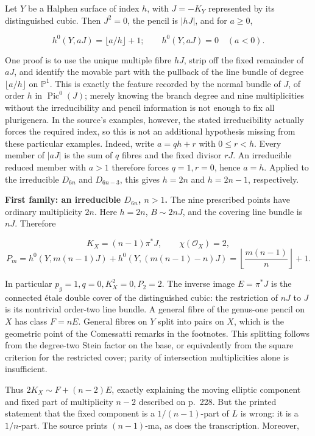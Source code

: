 Let \(Y\) be a Halphen surface of index \(h\), with \(J=-K_Y\) represented by its distinguished cubic. Then \(J^2=0\), the pencil is \(|hJ|\), and for \(a\geq0\),

\[
h^0(Y,aJ)=\lfloor a/h\rfloor+1;
\qquad h^0(Y,aJ)=0\quad(a<0).
\tag{VI-H}
\]

One proof is to use the unique multiple fibre \(hJ\), strip off the fixed remainder of \(aJ\), and identify the movable part with the pullback of the line bundle of degree \(\lfloor a/h\rfloor\) on \(\mathbb P^1\). This is exactly the feature recorded by the normal bundle of \(J\), of order \(h\) in \(\operatorname{Pic}^0(J)\); merely knowing the branch degree and nine multiplicities without the irreducibility and pencil information is not enough to fix all plurigenera. In the source's examples, however, the stated irreducibility actually forces the required index, so this is not an additional hypothesis missing from these particular examples. Indeed, write \(a=qh+r\) with \(0\leq r<h\). Every member of \(|aJ|\) is the sum of \(q\) fibres and the fixed divisor \(rJ\). An irreducible reduced member with \(a>1\) therefore forces \(q=1,r=0\), hence \(a=h\). Applied to the irreducible \(D_{6n}\) and \(D_{6n-3}\), this gives \(h=2n\) and \(h=2n-1\), respectively.

\textbf{First family: an irreducible \(D_{6n}\), \(n>1\).} The nine prescribed points have ordinary multiplicity \(2n\). Here \(h=2n\), \(B\sim2nJ\), and the covering line bundle is \(nJ\). Therefore

\[
K_X=(n-1)\pi^*J,\qquad \chi(\mathcal O_X)=2,
\] \[
P_m=h^0(Y,m(n-1)J)+h^0(Y,(m(n-1)-n)J)
=\left\lfloor\frac{m(n-1)}n\right\rfloor+1.
\tag{VI-H1}
\]

In particular \(p_g=1,q=0,K_X^2=0,P_2=2\). The inverse image \(E=\pi^*J\) is the connected étale double cover of the distinguished cubic: the restriction of \(nJ\) to \(J\) is its nontrivial order-two line bundle. A general fibre of the genus-one pencil on \(X\) has class \(F=nE\). General fibres on \(Y\) split into pairs on \(X\), which is the geometric point of the Comessatti remarks in the footnotes. This splitting follows from the degree-two Stein factor on the base, or equivalently from the square criterion for the restricted cover; parity of intersection multiplicities alone is insufficient.

Thus \(2K_X\sim F+(n-2)E\), exactly explaining the moving elliptic component and fixed part of multiplicity \(n-2\) described on p.~228. But the printed statement that the fixed component is a \(1/(n-1)\)-part of \(L\) is wrong: it is a \(1/n\)-part. The source prints \((n-1)\)-ma, as does the transcription. Moreover,

